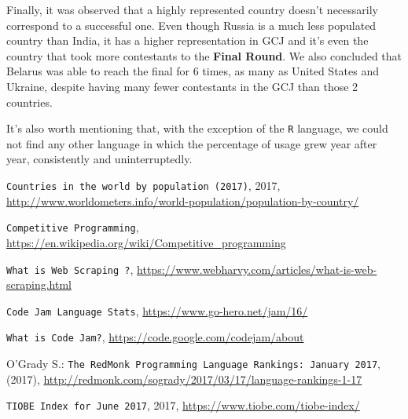 \documentclass{article}
\begin{document}
\begin{multicols*}{2}
Finally, it was observed that a highly represented country doesn't necessarily correspond to a successful one. Even though Russia is a much less populated country than India, it has a higher representation in GCJ and it's even the country that took more contestants to the \textbf{Final Round}. We also concluded that Belarus was able to reach the final for 6 times, as many as United States and Ukraine, despite having many fewer contestants in the GCJ than those 2 countries.

It's also worth mentioning that, with the exception of the \texttt{R} language, we could not find any other language in which the percentage of usage grew year after year, consistently and uninterruptedly.

\begin{thebibliography}{1}

\raggedright
\texttt{Countries in the world by population (2017)}, 2017, \url{http://www.worldometers.info/world-population/population-by-country/}

\raggedright \texttt{Competitive Programming}, \url{https://en.wikipedia.org/wiki/Competitive_programming}


\raggedright \texttt{What is Web Scraping ?}, \url{https://www.webharvy.com/articles/what-is-web-scraping.html}

\raggedright \texttt{Code Jam Language Stats}, \url{https://www.go-hero.net/jam/16/}

\raggedright \texttt{What is Code Jam?}, \url{https://code.google.com/codejam/about}

\raggedright
O'Grady S.: \texttt{The RedMonk Programming Language Rankings: January 2017}, (2017), \url{http://redmonk.com/sogrady/2017/03/17/language-rankings-1-17}


\raggedright \texttt{TIOBE Index for June 2017}, 2017, \url{https://www.tiobe.com/tiobe-index/}

\end{thebibliography}

\end{multicols*}
\end{document}
